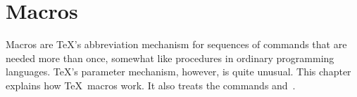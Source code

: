 \documentclass[letterpaper]{book}
\begin{document}
\chapter{Macros}\label{macro}

Macros are \TeX's abbreviation mechanism for sequences of commands
that are needed more than once,
somewhat like procedures in ordinary programming languages.
\TeX's parameter mechanism, however, is quite unusual.
This chapter explains how \TeX\ macros work. It also
treats the commands  and~.
\end{document}
